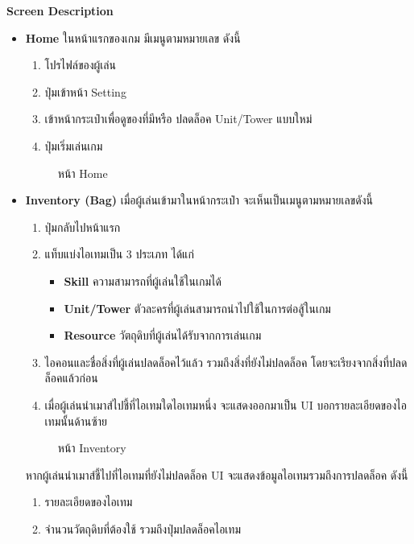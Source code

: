 \documentclass[12pt,oneside,openright,a4paper]{cpe-thai-project}
\begin{document}
\pagebreak
\textbf{Screen Description}
\begin{itemize}
  \item \textbf{Home} ในหน้าแรกของเกม มีเมนูตามหมายเลข ดังนี้
  \begin{enumerate}
    \item โปรไฟล์ของผู้เล่น
    \item ปุ่มเข้าหน้า Setting
    \item เข้าหน้ากระเป๋าเพื่อดูของที่มีหรือ ปลดล็อค Unit/Tower แบบใหม่
    \item ปุ่มเริ่มเล่นเกม
  \end{enumerate}

  \begin{figure}[H]\centering
    \setlength{\fboxsep}{0cm}
    \caption{หน้า Home}\label{fig:3-9}
  \end{figure}

  \item \textbf{Inventory (Bag)} เมื่อผู้เล่นเข้ามาในหน้ากระเป๋า 
  จะเห็นเป็นเมนูตามหมายเลขดังนี้
  \begin{enumerate}
    \item ปุ่มกลับไปหน้าแรก
    \item แท็บแบ่งไอเทมเป็น 3 ประเภท ได้แก่
    \begin{itemize}
      \item \textbf{Skill} ความสามารถที่ผู้เล่นใช้ในเกมได้
      \item \textbf{Unit/Tower} ตัวละครที่ผู้เล่นสามารถนำไปใช้ในการต่อสู้ในเกม
      \item \textbf{Resource} วัตถุดิบที่ผู้เล่นได้รับจากการเล่นเกม
    \end{itemize}
    \item ไอคอนและชื่อสิ่งที่ผู้เล่นปลดล็อคไว้แล้ว 
    รวมถึงสิ่งที่ยังไม่ปลดล็อค โดยจะเรียงจากสิ่งที่ปลดล็อคแล้วก่อน
    \item เมื่อผู้เล่นนำเมาส์ไปชี้ที่ไอเทมใดไอเทมหนึ่ง 
    จะแสดงออกมาเป็น UI บอกรายละเอียดของไอเทมนั้นด้านซ้าย
  \end{enumerate}

  \begin{figure}[H]\centering
    \setlength{\fboxsep}{0cm}
    \caption{หน้า Inventory}\label{fig:3-10}
  \end{figure}

  \pagebreak
  หากผู้เล่นนำเมาส์ชี้ไปที่ไอเทมที่ยังไม่ปลดล็อค UI 
  จะแสดงข้อมูลไอเทมรวมถึงการปลดล็อค ดังนี้
  \begin{enumerate}
    \item รายละเอียดของไอเทม
    \item จำนวนวัตถุดิบที่ต้องใช้ รวมถึงปุ่มปลดล็อคไอเทม
  \end{enumerate}


\end{itemize}
\end{document}
